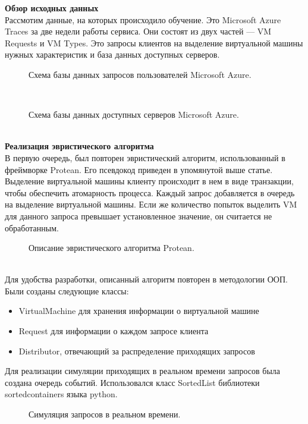 \documentclass[draft]{article}
\begin{document}
\textbf{Обзор исходных данных}\\
Рассмотим данные, на которых происходило обучение. Это Microsoft Azure Traces за две недели работы сервиса. Они состоят из двух частей — VM Requests и VM Types. Это запросы клиентов на выделение виртуальной машины нужных характеристик и база данных доступных серверов. 
\begin{figure}[h]
\caption{Схема базы данных запросов пользователей Microsoft Azure\cite{litlink22}.}
\label{ris:image}
\end{figure}\\
\begin{figure}[h]
\caption{Схема базы данных доступных серверов Microsoft Azure\cite{litlink22}.}
\label{ris:image}
\end{figure}\\
\textbf{Реализация эвристического алгоритма}\\
В первую очередь, был повторен эвристический алгоритм, использованный в фреймворке Protean. Его псевдокод приведен в упомянутой выше статье. Выделение виртуальной машины клиенту происходит в нем в виде транзакции, чтобы обеспечить атомарность процесса. Каждый запрос добавляется в очередь на выделение виртуальной машины. Если же количество попыток выделить VM для данного запроса превышает установленное значение, он считается не обработанным.\\
\begin{figure}[h]
\caption{Описание эвристического алгоритма Protean\cite{litlink21}.}
\label{ris:image}
\end{figure}\\
Для удобства разработки, описанный алгоритм повторен в методологии ООП. Были созданы следующие классы: 
\begin{itemize}
\item VirtualMachine для хранения информации о виртуальной машине
\item Request для информации о каждом запросе клиента
\item Distributor, отвечающий за распределение приходящих запросов
\end{itemize}
Для реализации симуляции приходящих в реальном времени запросов была создана очередь событий. Использовался класс SortedList библиотеки sortedcontainers языка python. 
\begin{figure}[h!]
\caption{Симуляция запросов в реальном времени.}
\label{ris:image}
\end{figure}\\
\end{document}
